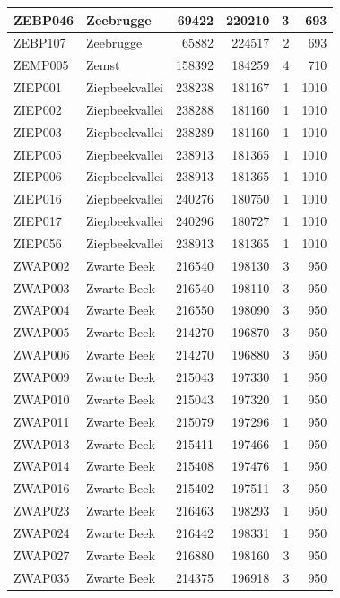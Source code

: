 \documentclass[11pt,]{book}
\begin{document}
\begin{table}
\begin{tabular}[t]{l|l|r|r|r|r}
\hline
ZEBP046 & Zeebrugge & 69422 & 220210 & 3 & 693\\
\hline
ZEBP107 & Zeebrugge & 65882 & 224517 & 2 & 693\\
\hline
ZEMP005 & Zemst & 158392 & 184259 & 4 & 710\\
\hline
ZIEP001 & Ziepbeekvallei & 238238 & 181167 & 1 & 1010\\
\hline
ZIEP002 & Ziepbeekvallei & 238288 & 181160 & 1 & 1010\\
\hline
ZIEP003 & Ziepbeekvallei & 238289 & 181160 & 1 & 1010\\
\hline
ZIEP005 & Ziepbeekvallei & 238913 & 181365 & 1 & 1010\\
\hline
ZIEP006 & Ziepbeekvallei & 238913 & 181365 & 1 & 1010\\
\hline
ZIEP016 & Ziepbeekvallei & 240276 & 180750 & 1 & 1010\\
\hline
ZIEP017 & Ziepbeekvallei & 240296 & 180727 & 1 & 1010\\
\hline
ZIEP056 & Ziepbeekvallei & 238913 & 181365 & 1 & 1010\\
\hline
ZWAP002 & Zwarte Beek & 216540 & 198130 & 3 & 950\\
\hline
ZWAP003 & Zwarte Beek & 216540 & 198110 & 3 & 950\\
\hline
ZWAP004 & Zwarte Beek & 216550 & 198090 & 3 & 950\\
\hline
ZWAP005 & Zwarte Beek & 214270 & 196870 & 3 & 950\\
\hline
ZWAP006 & Zwarte Beek & 214270 & 196880 & 3 & 950\\
\hline
ZWAP009 & Zwarte Beek & 215043 & 197330 & 1 & 950\\
\hline
ZWAP010 & Zwarte Beek & 215043 & 197320 & 1 & 950\\
\hline
ZWAP011 & Zwarte Beek & 215079 & 197296 & 1 & 950\\
\hline
ZWAP013 & Zwarte Beek & 215411 & 197466 & 1 & 950\\
\hline
ZWAP014 & Zwarte Beek & 215408 & 197476 & 1 & 950\\
\hline
ZWAP016 & Zwarte Beek & 215402 & 197511 & 3 & 950\\
\hline
ZWAP023 & Zwarte Beek & 216463 & 198293 & 1 & 950\\
\hline
ZWAP024 & Zwarte Beek & 216442 & 198331 & 1 & 950\\
\hline
ZWAP027 & Zwarte Beek & 216880 & 198160 & 3 & 950\\
\hline
ZWAP035 & Zwarte Beek & 214375 & 196918 & 3 & 950\\
\hline

\end{tabular}
\end{table}
\end{document}
